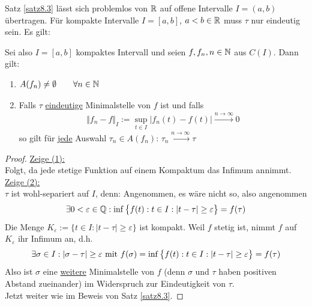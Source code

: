 Satz \ref{satz8.3} lässt sich problemlos von $\R$ auf offene Intervalle $I=(a,b)$ übertragen.\nl
Für kompakte Intervalle $I=[a,b]$, $a<b\in\R$ muss $\tau$ nur eindeutig sein.
Es gilt:

\begin{satz}\label{satz8.4}
	Sei also $I=[a,b]$ kompaktes Intervall und seien $f,f_n,n\in\N$ aus $C(I)$. 
	Dann gilt:
	\begin{enumerate}[label=(\arabic*)]
		\item $\begin{aligned}
			A(f_n)\neq\emptyset\qquad\forall n\in\N
		\end{aligned}$
		\item Falls $\tau$ \underline{eindeutige} Minimalstelle von $f$ ist und falls
		\begin{align*}
			\Vert f_n-f\Vert_I:=\sup\limits_{t\in I}\big|f_n(t)-f(t)\big|\overset{n\to\infty}{\longrightarrow}0
		\end{align*}
		so gilt für \underline{jede} Auswahl $\tau_n\in A(f_n)$:
		$\tau_n\overset{n\to\infty}{\longrightarrow}\tau$
	\end{enumerate}
\end{satz}


\begin{proof}
	\underline{Zeige (1):}\\
	Folgt, da jede stetige Funktion auf einem Kompaktum das Infimum annimmt.\nl
	\underline{Zeige (2):}\\
	$\tau$ ist wohl-separiert auf $I$, denn: 
	Angenommen, es wäre nicht so, also angenommen
	\begin{align*}
		\exists0<\varepsilon\in\Q:\inf\limits\big\lbrace f(t):t\in I:|t-\tau|\geq\varepsilon\big\rbrace=f(\tau)
	\end{align*}
	Die Menge $K_\varepsilon:=\lbrace t\in I:|t-\tau|\geq\varepsilon\rbrace$ ist kompakt.  
	Weil $f$ stetig ist, nimmt $f$ auf $K_\varepsilon$ ihr Infimum an, d.h.
	\begin{align*}
		\exists\sigma\in I:|\sigma-\tau|\geq\varepsilon\mit f(\sigma)=\inf\limits
		\big\lbrace f(t):t\in I:|t-\tau|\geq\varepsilon\big\rbrace
		=f(\tau)
	\end{align*}
	Also ist $\sigma$ eine \underline{weitere} Minimalstelle von $f$ (denn $\sigma$ und $\tau$ haben positiven Abstand zueinander) im Widerspruch zur Eindeutigkeit von $\tau$.\\
	Jetzt weiter wie im Beweis von Satz \ref{satz8.3}.
\end{proof}

